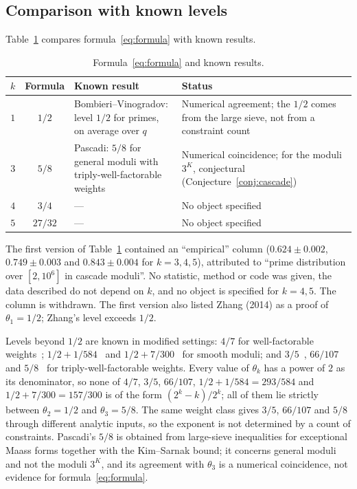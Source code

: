 \documentclass[12pt]{amsart}
\theoremstyle{plain}
\theoremstyle{definition}
\theoremstyle{remark}
\newcommand{\thetak}{\theta_k}
\begin{document}
\subsection{Comparison with known levels}
\label{sec:known}

Table~\ref{tab:validation} compares formula~\eqref{eq:formula} with known
results.

\begin{table}[h]
\centering
\caption{Formula~\eqref{eq:formula} and known results.}
\label{tab:validation}
\begin{tabular}{ccp{4.6cm}p{5.2cm}}
\toprule
$k$ & Formula & Known result & Status \\
\midrule
$1$ & $1/2$   & Bombieri--Vinogradov: level $1/2$ for primes, on average
  over $q$~\cite{Bombieri1965,Vinogradov1965}
  & Numerical agreement; the $1/2$ comes from the large sieve, not from a
    constraint count \\
$3$ & $5/8$   & Pascadi: $5/8$ for general moduli with
  triply-well-factorable weights~\cite{Pascadi2025}
  & Numerical coincidence; for the moduli $3^K$, conjectural
    (Conjecture~\ref{conj:cascade}) \\
$4$ & $3/4$   & ---  & No object specified \\
$5$ & $27/32$ & ---  & No object specified \\
\bottomrule
\end{tabular}
\end{table}

The first version of Table~\ref{tab:validation} contained an ``empirical''
column ($0.624 \pm 0.002$, $0.749 \pm 0.003$ and $0.843 \pm 0.004$ for
$k = 3, 4, 5$), attributed to ``prime distribution over $[2, 10^6]$ in cascade
moduli''. No statistic, method or code was given, the data described do not
depend on $k$, and no object is specified for $k = 4, 5$. The column is
withdrawn. The first version also listed Zhang (2014) as a proof of
$\theta_1 = 1/2$; Zhang's level exceeds $1/2$.

Levels beyond $1/2$ are known in modified settings: $4/7$ for well-factorable
weights~\cite{BFI1986}; $1/2 + 1/584$~\cite{Zhang2014} and
$1/2 + 7/300$~\cite{Polymath2014} for smooth moduli; and
$3/5$~\cite{Maynard2020}, $66/107$~\cite{Lichtman2023} and
$5/8$~\cite{Pascadi2025} for triply-well-factorable weights. Every value of
$\thetak$ has a power of $2$ as its denominator, so none of $4/7$, $3/5$,
$66/107$, $1/2 + 1/584 = 293/584$ and $1/2 + 7/300 = 157/300$ is of the form $(2^k-k)/2^k$; all of them lie
strictly between $\theta_2 = 1/2$ and $\theta_3 = 5/8$. The same weight class
gives $3/5$, $66/107$ and $5/8$ through different analytic inputs, so the
exponent is not determined by a count of constraints. Pascadi's $5/8$ is
obtained from large-sieve inequalities for exceptional Maass forms together with
the Kim--Sarnak bound; it concerns general moduli and not the moduli $3^K$, and
its agreement with $\theta_3$ is a numerical coincidence, not evidence for
formula~\eqref{eq:formula}.
\end{document}
